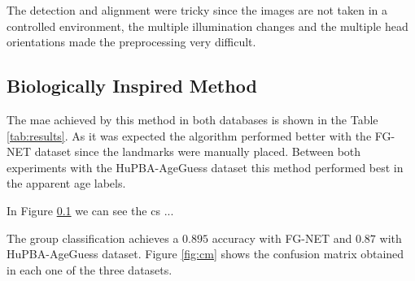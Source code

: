 The detection and alignment were tricky since the images are not taken in a controlled environment, the multiple illumination changes and the multiple head orientations made the preprocessing very difficult.

\subsection{Biologically Inspired Method}

The \gls{mae} achieved by this method in both databases is shown in the Table \ref{tab:results}. As it was expected the algorithm performed better with the FG-NET dataset since the landmarks were manually placed. Between both experiments with the HuPBA-AgeGuess dataset this method performed best in the apparent age labels.

In Figure \ref{} we can see the \gls{cs} ... 

The group classification achieves a $0.895$ accuracy with FG-NET and $0.87$ with HuPBA-AgeGuess dataset. Figure \ref{fig:cm} shows the confusion matrix obtained in each one of the three datasets.

